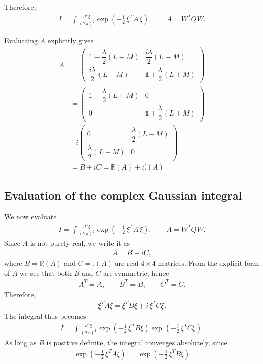 \documentclass[%
 reprint,
 amsmath,amssymb,
 aps,
twocolumn
]{revtex4-2}
\begin{document}
Therefore,
\begin{align}
I
=
\int \frac{d^4\xi}{(2\pi)^2}
\exp\!\left(-\frac12\,\xi^T A\,\xi\right),
\qquad
A=W^T Q W.
\end{align}

Evaluating \(A\) explicitly gives
\begin{align}
A&=
\begin{pmatrix}
\mathbb{1}-\dfrac{\lambda}{2}(L+M) & \dfrac{i\lambda}{2}(L-M)\\[2mm]
\dfrac{i\lambda}{2}(L-M) & \mathbb{1}+\dfrac{\lambda}{2}(L+M)
\end{pmatrix}\\
&=
\begin{pmatrix}
\mathbb{1}-\dfrac{\lambda}{2}(L+M) & 0\\[2mm]
0 & \mathbb{1}+\dfrac{\lambda}{2}(L+M)
\end{pmatrix}\\
&+
i\begin{pmatrix}
0 & \dfrac{\lambda}{2}(L-M)\\[2mm]
\dfrac{\lambda}{2}(L-M) & 0
\end{pmatrix}\\
&=B+iC=\mathbb{R}(A)+i\mathbb{I}(A)
\end{align}

\subsection{Evaluation of the complex Gaussian integral}

We now evaluate
\begin{align}
I
=
\int \frac{d^4\xi}{(2\pi)^2}
\exp\!\left(-\frac12\,\xi^T A\,\xi\right),
\qquad
A=W^TQW.
\end{align}
Since $A$ is not purely real, we write it as
\begin{align}
A=B+iC,
\end{align}
where $B=\mathbb{R}(A)$ and $C=\mathbb{I}(A)$ are real $4\times4$ matrices. From the explicit form of $A$ we see that both $B$ and $C$ are symmetric, hence
\begin{align}
A^T=A,\qquad B^T=B,\qquad C^T=C.
\end{align}
Therefore,
\begin{align}
\xi^T A\xi=\xi^T B\xi+i\,\xi^T C\xi.
\end{align}
The integral thus becomes
\begin{align}
I
=
\int \frac{d^4\xi}{(2\pi)^2}
\exp\!\left(-\frac12\,\xi^T B\xi\right)
\exp\!\left(-\frac{i}{2}\,\xi^T C\xi\right).
\end{align}
As long as $B$ is positive definite, the integral converges absolutely, since
\begin{align}
\left|
\exp\!\left(-\frac12\,\xi^T A\xi\right)
\right|
=
\exp\!\left(-\frac12\,\xi^T B\xi\right).
\end{align}
\end{document}
